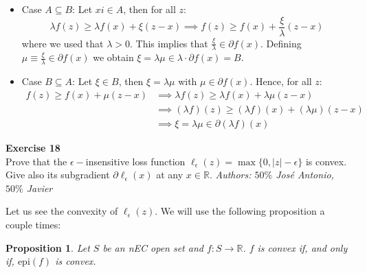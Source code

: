 \documentclass[11pt,table]{article}
\newenvironment{problem}[2][Exercise]
{ \begin{mdframed}[backgroundcolor=gray!20] \textbf{#1 #2} \\}
	{\hspace{0.0cm}\newline\newline \emph{Authors: \(50\%\) José Antonio, \(50\%\) Javier}  \end{mdframed}}
\newtheorem{nprop}{Proposition}
\newcommand\abs[1]{\lvert#1\rvert}
\newcommand\R{\mathbb R}
\begin{document}
\begin{itemize}
	\item Case $A \subseteq B$: Let $xi \in A$, then for all $z$:
	      \[
		      \lambda f(z) \ge \lambda f(x) + \xi (z-x) \implies f(z) \ge f(x) + \frac{\xi}{\lambda}(z-x)
	      \]
	      where we used that $\lambda > 0$. This implies that $\frac{\xi}{\lambda} \in \partial f(x)$. Defining $\mu \equiv \frac{\xi}{\lambda} \in \partial f(x)$ we obtain $\xi = \lambda \mu \in \lambda \cdot \partial f(x) = B$.

	\item Case $B \subseteq A$: Let $\xi \in B$, then $\xi = \lambda \mu$ with $\mu \in \partial f(x)$. Hence, for all $z$:
	      \begin{align*}
		      f(z) \ge f(x) + \mu(z-x) & \implies \lambda f(z) \ge \lambda f(x) + \lambda\mu(z-x)       \\
		                               & \implies (\lambda f)(z) \ge (\lambda f)(x) + (\lambda\mu)(z-x) \\
		                               & \implies \xi = \lambda \mu \in \partial(\lambda f)(x)
	      \end{align*}
\end{itemize}

\begin{problem}{18}
Prove that the \(\epsilon-\)insensitive loss function \(\ell_\epsilon(z) = \max\{0,\abs{z} - \epsilon\}\) is convex. Give also its subgradient \(\partial \ell_\epsilon(x)\) at any \(x \in \R\).
\end{problem}


Let us see the convexity of \(\ell_\epsilon(z)\). We will use the following proposition a couple times:
\begin{nprop}
	Let \(S\) be an nEC open set and \(f:S\to \R\). \(f\) is convex if, and only if, \(\text{epi}(f)\) is convex.
\end{nprop}
\end{document}
